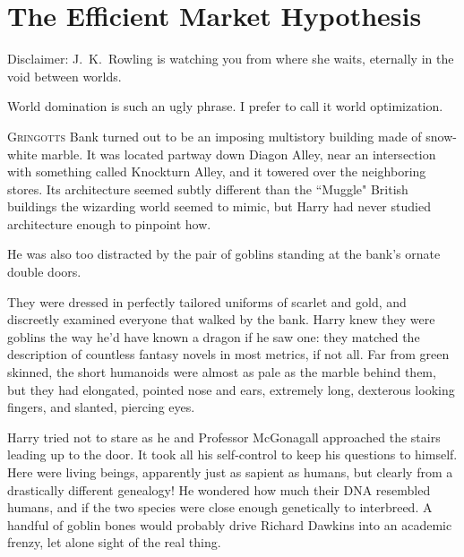 \chapter[The Efficient Market Hypothesis]{The Efficient Market Hypothesis\protect\authorsnotefootnotemark}

\begin{chapterOpeningAuthorNote}
Disclaimer: J.~K.~Rowling is watching you from where she waits, eternally in the void between worlds.
\end{chapterOpeningAuthorNote}
\begin{chapterOpeningQuote}
World domination is such an ugly phrase. I prefer to call it world optimization.
\end{chapterOpeningQuote}


\lettrine{G}{ringotts} Bank turned out to be an imposing multistory building made of snow-white marble. It was located partway down Diagon Alley, near an intersection with something called Knockturn Alley, and it towered over the neighboring stores. Its architecture seemed subtly different than the ``Muggle" British buildings the wizarding world seemed to mimic, but Harry had never studied architecture enough to pinpoint how.

He was also too distracted by the pair of goblins standing at the bank's ornate double doors.

They were dressed in perfectly tailored uniforms of scarlet and gold, and discreetly examined everyone that walked by the bank. Harry knew they were goblins the way he'd have known a dragon if he saw one: they matched the description of countless fantasy novels in most metrics, if not all. Far from green skinned, the short humanoids were almost as pale as the marble behind them, but they had elongated, pointed nose and ears, extremely long, dexterous looking fingers, and slanted, piercing eyes.

Harry tried not to stare as he and Professor McGonagall approached the stairs leading up to the door. It took all his self-control to keep his questions to himself. Here were living beings, apparently just as sapient as humans, but clearly from a drastically different genealogy! He wondered how much their DNA resembled humans, and if the two species were close enough genetically to interbreed. A handful of goblin bones would probably drive Richard Dawkins into an academic frenzy, let alone sight of the real thing.


